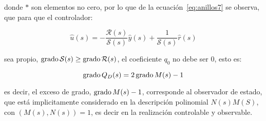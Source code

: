         donde $*$ son elementos no cero, por lo que de la ecuación~\ref{eq:anillos7} se observa, que para que el controlador:

        \begin{equation*}
            \hat{u}(s) = - \frac{\mathcal{R}(s)}{\mathcal{S}(s)} \hat{y}(s) + \frac{1}{\mathcal{S}(s)} \hat{r}(s)
        \end{equation*}

        sea propio, $\operatorname{grado}{\mathcal{S}}(s) \ge \operatorname{grado}{\mathcal{R}}(s)$, el coeficiente $q_0$ no debe ser $0$, esto es:

        \begin{equation*}
            \operatorname{grado}{Q_D(s)} = 2 \operatorname{grado}{M(s)} - 1
        \end{equation*}

        es decir, el exceso de grado, $\operatorname{grado}{M(s)} - 1$, corresponde al observador de estado, que está implicitamente considerado en la descripción polinomial $N(s) M(S)$, con $(M(s), N(s)) = 1$, es decir en la realización controlable y observable.
